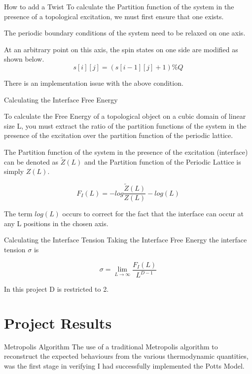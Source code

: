 \documentclass[12pt]{beamer}
\begin{document}
\begin{frame}{How to add a Twist}
To calculate the Partition function of the system in the presence of a topological excitation, we must first ensure that one exists.

The periodic boundary conditions of the system need to be relaxed on one axis.

At an arbitrary point on this axis, the spin states on one side are modified as shown below.
\begin{equation}
s[i][j] = (s[i-1][j] + 1)\% Q
\end{equation}

There is an implementation issue with the above condition.

\end{frame}

\begin{frame}{Calculating the Interface Free Energy}

To calculate the Free Energy of a topological object on a cubic domain of linear size L, you must extract the ratio of the partition functions of the system in the presence of the excitation over the partition function of the periodic lattice.

The Partition function of the system in the presence of the excitation (interface) can be denoted as $\tilde{Z}(L)$ and the Partition function of the Periodic Lattice is simply $Z(L)$.

\begin{equation}
F_I (L) = -log \frac{\tilde{Z}(L)}{Z(L)} - log(L)
\end{equation}

The term $log(L)$ occurs to correct for the fact that the interface can occur at any L positions in the chosen axis.

\end{frame}


\begin{frame}{Calculating the Interface Tension}
Taking the Interface Free Energy the interface tension $\sigma$ is

\begin{equation}
\sigma = \lim_{L \to \infty} \frac{F_I(L)}{L^{D-1}}
\end{equation}

In this project D is restricted to 2.
\end{frame}

\section{Project Results}
\begin{frame}{Metropolis Algorithm}
The use of a traditional Metropolis algorithm to reconstruct the expected behaviours from the various thermodynamic quantities, was the first stage in verifying I had successfully implemented the Potts Model.

\end{frame}
\end{document}
